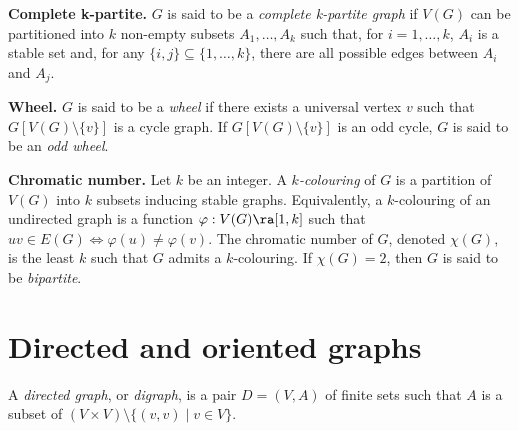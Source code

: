 \medskip

\textbf{Complete k-partite.}
$G$ is said to be a {\em complete k-partite graph} if $V(G)$ can be partitioned into $k$ non-empty subsets $A_1, \dots, A_k$ such that, for $i=1, \dots, k$, $A_i$ is a stable set and, for any $\{i,j\} \subseteq \{1, \dots, k\}$, there are all possible edges between $A_i$ and $A_j$.

\medskip

\textbf{Wheel.}
$G$ is said to be a \emph{wheel} if there exists a universal vertex $v$ such that $G[V(G) \setminus \{v\}]$ is a cycle graph. If $G[V(G) \setminus \{v\}]$ is an odd cycle, $G$ is said to be an \emph{odd wheel}.


\medskip

\textbf{Chromatic number.}
Let $k$ be an integer. A \emph{$k$-colouring} of $G$ is a partition of $V(G)$ into $k$ subsets inducing stable graphs. Equivalently, a $k$-colouring of an undirected graph is a function $\varphi : V(G) \ra [1,k]$ such that $uv \in E(G) \Leftrightarrow \varphi(u) \neq \varphi(v)$. The chromatic number of $G$, denoted $\chi(G)$, is the least $k$ such that $G$ admits a $k$-colouring. If $\chi(G) = 2$, then $G$ is said to be \emph{bipartite}.







\section{Directed and oriented graphs}

A \emph{directed graph}, or \emph{digraph}, is a pair $D = (V,A)$ of finite sets such that $A$ is a subset of $(V \times V) \setminus \{(v,v) \mid v \in V\}$.

